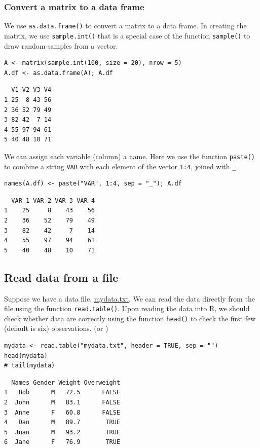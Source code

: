 \documentclass[a4paper,11pt]{article}
\begin{document}
\subsubsection*{Convert a matrix to a data frame}
\label{sec:org96581f0}

We use \texttt{as.data.frame()} to convert a matrix to a data frame. In
creating the matrix, we use \texttt{sample.int()} that is a special case of
the function \texttt{sample()} to draw random samples from a vector.
\begin{verbatim}
A <- matrix(sample.int(100, size = 20), nrow = 5)
A.df <- as.data.frame(A); A.df
\end{verbatim}

\begin{verbatim}
  V1 V2 V3 V4
1 25  8 43 56
2 36 52 79 49
3 82 42  7 14
4 55 97 94 61
5 40 48 10 71
\end{verbatim}

We can assign each variable (column) a name. Here we use the function
\texttt{paste()} to combine a string \texttt{VAR} with each element of the vector
\texttt{1:4}, joined with \texttt{\_}.
\begin{verbatim}
names(A.df) <- paste("VAR", 1:4, sep = "_"); A.df
\end{verbatim}

\begin{verbatim}
  VAR_1 VAR_2 VAR_3 VAR_4
1    25     8    43    56
2    36    52    79    49
3    82    42     7    14
4    55    97    94    61
5    40    48    10    71
\end{verbatim}


\subsection{Read data from a file}
\label{sec:org2af0854}

Suppose we have a data file, \url{mydata.txt}. We can read the data
directly from the file using the function \texttt{read.table()}. Upon reading
the data into R, we should check whether data are correctly using the
function \texttt{head()} to check the first few (default is six)
observations. (or )

\begin{verbatim}
mydata <- read.table("mydata.txt", header = TRUE, sep = "")
head(mydata)
# tail(mydata)
\end{verbatim}

\begin{verbatim}
  Names Gender Weight Overweight
1   Bob      M   72.5      FALSE
2  John      M   83.1      FALSE
3  Anne      F   60.8      FALSE
4   Dan      M   89.7       TRUE
5  Juan      M   93.2       TRUE
6  Jane      F   76.9       TRUE
\end{verbatim}
\end{document}
